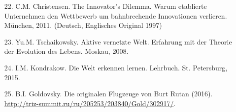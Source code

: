 \documentclass[11pt,a4paper]{article}
\begin{document}
\begin{itemize}
\item[22.] C.M. Christensen. The Innovator's Dilemma. Warum etablierte
  Unternehmen den Wettbewerb um bahnbrechende Innovationen verlieren. München,
  2011.  (Deutsch, Englisches Original 1997)
\item[23.] Yu.M. Tschaikowsky. Aktive vernetzte Welt. Erfahrung mit der
  Theorie der Evolution des Lebens. Moskau, 2008.
\item[24.] I.M. Kondrakow. Die Welt erkennen lernen. Lehrbuch. St. Petersburg,
  2015.
\item[25.] B.I. Goldovsky. Die originalen Flugzeuge von Burt Rutan (2016).\\
  \url{http://triz-summit.ru/ru/205253/203840/Gold/302917/}. 
\end{itemize}
\end{document}
